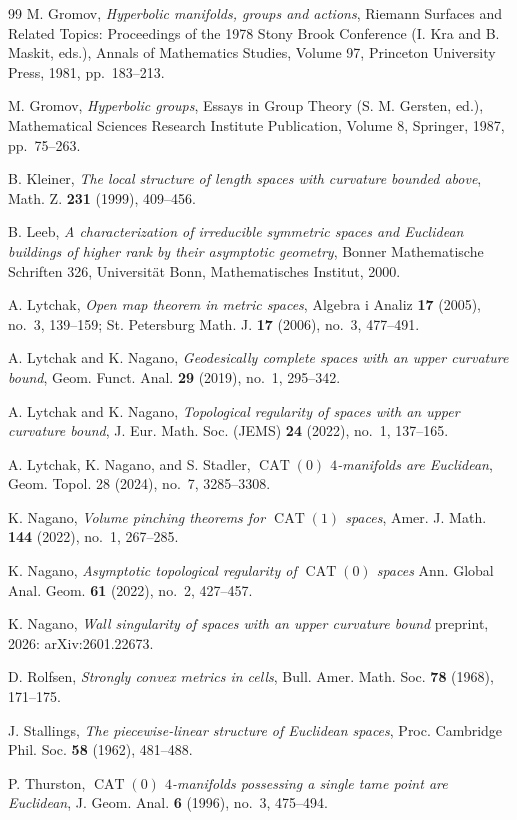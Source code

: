 \documentclass[a4paper,12pt]{amsart}
\newcommand{\CAT}{\operatorname{CAT}}
\numberwithin{equation}{section}
\theoremstyle{plain}
\theoremstyle{definition}
\theoremstyle{remark}
\begin{document}
\begin{thebibliography}{99}
M. Gromov,
\emph{Hyperbolic manifolds, groups and actions},
Riemann Surfaces and Related Topics:
Proceedings of the 1978 Stony Brook Conference 
(I. Kra and B. Maskit, eds.),
Annals of Mathematics Studies, Volume 97,
Princeton University Press, 1981,
pp.~183--213.

M. Gromov,
\emph{Hyperbolic groups},
Essays in Group Theory (S. M. Gersten, ed.), 
Mathematical Sciences Research Institute Publication, Volume 8, Springer, 1987,
pp.~75--263.

B. Kleiner,
\emph{The local structure of length spaces with curvature bounded above},
Math. Z. {\bf 231} (1999), 409--456.

B. Leeb,
\emph{A characterization of irreducible symmetric spaces and Euclidean buildings
of higher rank by their asymptotic geometry},
Bonner Mathematische Schriften 326,
Universit\"{a}t Bonn, Mathematisches Institut, 2000.

A. Lytchak,
\emph{Open map theorem in metric spaces},
Algebra i Analiz {\bf 17} (2005), no.~3, 139--159;
St. Petersburg Math. J. {\bf 17} (2006), no.~3, 477--491.

A. Lytchak and K. Nagano,
\emph{Geodesically complete spaces with an upper curvature bound},
Geom. Funct. Anal. {\bf 29} (2019), no.~1, 295--342.

A. Lytchak and K. Nagano,
\emph{Topological regularity of spaces with an upper curvature bound},
J. Eur. Math. Soc. (JEMS) {\bf 24} (2022), no.~1, 137--165.

A. Lytchak, K. Nagano, and S. Stadler,
\emph{$\CAT(0)$ $4$-manifolds are Euclidean},
Geom. Topol. 28 (2024), no.~7, 3285--3308.

K. Nagano,
\emph{Volume pinching theorems for $\CAT(1)$ spaces},
Amer. J. Math. {\bf 144} (2022), no.~1, 267--285.

K. Nagano,
\emph{Asymptotic topological regularity of $\CAT(0)$ spaces}
Ann. Global Anal. Geom. {\bf 61} (2022), no.~2, 427--457.

K. Nagano,
\emph{Wall singularity of spaces with an upper curvature bound}
preprint, 2026:
arXiv:2601.22673.

D. Rolfsen,
\emph{Strongly convex metrics in cells},
Bull. Amer. Math. Soc. {\bf 78} (1968), 171--175.

J. Stallings,
\emph{The piecewise-linear structure of Euclidean spaces},
Proc. Cambridge Phil. Soc. {\bf 58} (1962), 481--488. 

P. Thurston,
\emph{$\CAT(0)$ $4$-manifolds possessing a single tame point are Euclidean},
J. Geom. Anal. {\bf 6} (1996), no.~3, 475--494.

\end{thebibliography}

\end{document}
